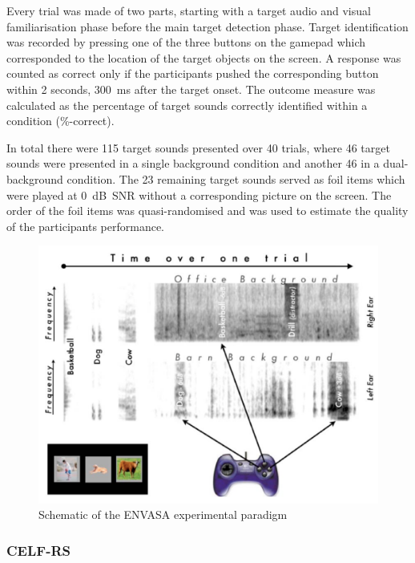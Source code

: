 \documentclass[a4paper, twoside]{templates/ociamthesis}
\begin{document}
Every trial was made of two parts, starting with a target audio and visual familiarisation phase before the main target detection phase. Target identification was recorded by pressing one of the three buttons on the gamepad which corresponded to the location of the target objects on the screen. A response was counted as correct only if the participants pushed the corresponding button within 2 seconds, 300~ms after the target onset. The outcome measure was calculated as the percentage of target sounds correctly identified within a condition (\%-correct).

In total there were 115 target sounds presented over 40 trials, where 46 target sounds were presented in a single background condition and another 46 in a dual-background condition. The 23 remaining target sounds served as foil items which were played at 0~dB~SNR without a corresponding picture on the screen. The order of the foil items was quasi-randomised and was used to estimate the quality of the participants performance.



\begin{figure}

{\centering \includegraphics[width=0.65\linewidth]{figures/ENVASAparadigm} 

}

\caption{Schematic of the ENVASA experimental paradigm \autocite[taken from][]{Leech2009}}\label{fig:ENVASA}
\end{figure}

\hypertarget{celf-rs}{%
\subsubsection{CELF-RS}\label{celf-rs}}
\end{document}
